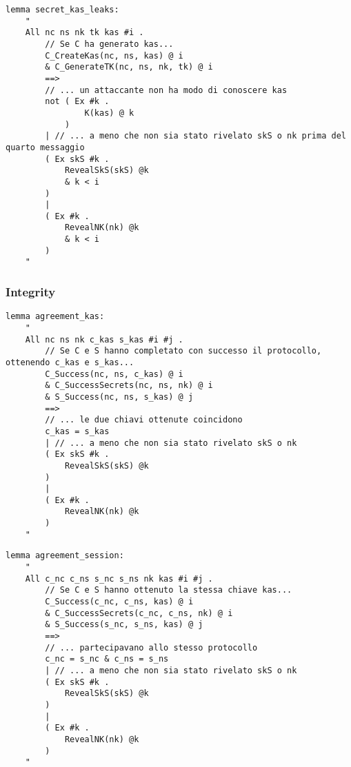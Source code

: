 \begin{lstlisting}[caption={Se il client e il server hanno ottenuto una chiave condivisa kas,
    sono i soli a conoscerla.
    Questa rimane sicura anche se avvengono dei leak a posteriori di informazioni segrete,
    garantendo forward secrecy, purchè ciò avvenga dopo il quarto messaggio del protocollo.},
    label=cod:lemma:secret_kas_leaks]
lemma secret_kas_leaks:
    "
    All nc ns nk tk kas #i .
        // Se C ha generato kas...
        C_CreateKas(nc, ns, kas) @ i
        & C_GenerateTK(nc, ns, nk, tk) @ i
        ==> 
        // ... un attaccante non ha modo di conoscere kas
        not ( Ex #k .
                K(kas) @ k
            )
        | // ... a meno che non sia stato rivelato skS o nk prima del quarto messaggio
        ( Ex skS #k .
            RevealSkS(skS) @k
            & k < i
        )
        |
        ( Ex #k .
            RevealNK(nk) @k
            & k < i
        )
    "
\end{lstlisting}

\subsubsection{Integrity}

\begin{lstlisting}[caption={Se il client e il server hanno ottenuto una chiave condivisa kas nella 
    stessa sessione, questa è uguale per entrambi},
    label=cod:lemma:agreement_kas]
lemma agreement_kas:
    "
    All nc ns nk c_kas s_kas #i #j .
        // Se C e S hanno completato con successo il protocollo, ottenendo c_kas e s_kas...
        C_Success(nc, ns, c_kas) @ i
        & C_SuccessSecrets(nc, ns, nk) @ i
        & S_Success(nc, ns, s_kas) @ j
        ==>
        // ... le due chiavi ottenute coincidono
        c_kas = s_kas
        | // ... a meno che non sia stato rivelato skS o nk
        ( Ex skS #k .
            RevealSkS(skS) @k
        )
        |
        ( Ex #k .
            RevealNK(nk) @k
        )
    "
\end{lstlisting}

\begin{lstlisting}[caption={Se il client e il server hanno ottenuto una stessa chiave condivisa kas,
    è perchè stanno partecipendo alla medesima sessione},
    label=cod:lemma:agreement_session]
lemma agreement_session:
    "
    All c_nc c_ns s_nc s_ns nk kas #i #j .
        // Se C e S hanno ottenuto la stessa chiave kas...
        C_Success(c_nc, c_ns, kas) @ i
        & C_SuccessSecrets(c_nc, c_ns, nk) @ i
        & S_Success(s_nc, s_ns, kas) @ j
        ==>
        // ... partecipavano allo stesso protocollo
        c_nc = s_nc & c_ns = s_ns
        | // ... a meno che non sia stato rivelato skS o nk
        ( Ex skS #k .
            RevealSkS(skS) @k
        )
        |
        ( Ex #k .
            RevealNK(nk) @k
        )
    "
\end{lstlisting}

